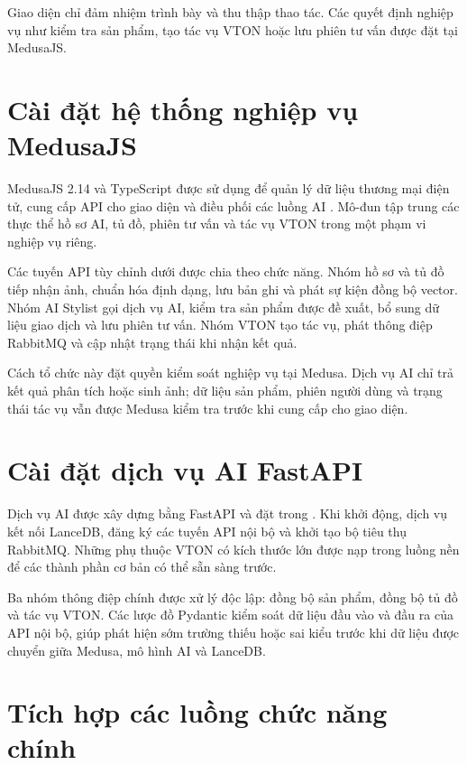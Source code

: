 \medskip

Giao diện chỉ đảm nhiệm trình bày và thu thập thao tác. Các quyết định nghiệp vụ như kiểm tra sản phẩm, tạo tác vụ VTON hoặc lưu phiên tư vấn được đặt tại MedusaJS.

\section{Cài đặt hệ thống nghiệp vụ MedusaJS}

MedusaJS 2.14 và TypeScript được sử dụng để quản lý dữ liệu thương mại điện tử, cung cấp API cho giao diện và điều phối các luồng AI \cite{medusa}. Mô-đun  tập trung các thực thể hồ sơ AI, tủ đồ, phiên tư vấn và tác vụ VTON trong một phạm vi nghiệp vụ riêng.

\medskip

Các tuyến API tùy chỉnh dưới  được chia theo chức năng. Nhóm hồ sơ và tủ đồ tiếp nhận ảnh, chuẩn hóa định dạng, lưu bản ghi và phát sự kiện đồng bộ vector. Nhóm AI Stylist gọi dịch vụ AI, kiểm tra sản phẩm được đề xuất, bổ sung dữ liệu giao dịch và lưu phiên tư vấn. Nhóm VTON tạo tác vụ, phát thông điệp RabbitMQ và cập nhật trạng thái khi nhận kết quả.

\medskip

Cách tổ chức này đặt quyền kiểm soát nghiệp vụ tại Medusa. Dịch vụ AI chỉ trả kết quả phân tích hoặc sinh ảnh; dữ liệu sản phẩm, phiên người dùng và trạng thái tác vụ vẫn được Medusa kiểm tra trước khi cung cấp cho giao diện.

\section{Cài đặt dịch vụ AI FastAPI}

Dịch vụ AI được xây dựng bằng FastAPI và đặt trong  \cite{fastapi}. Khi khởi động, dịch vụ kết nối LanceDB, đăng ký các tuyến API nội bộ và khởi tạo bộ tiêu thụ RabbitMQ. Những phụ thuộc VTON có kích thước lớn được nạp trong luồng nền để các thành phần cơ bản có thể sẵn sàng trước.

\medskip

Ba nhóm thông điệp chính được xử lý độc lập: đồng bộ sản phẩm, đồng bộ tủ đồ và tác vụ VTON. Các lược đồ Pydantic kiểm soát dữ liệu đầu vào và đầu ra của API nội bộ, giúp phát hiện sớm trường thiếu hoặc sai kiểu trước khi dữ liệu được chuyển giữa Medusa, mô hình AI và LanceDB.

\section{Tích hợp các luồng chức năng chính}

